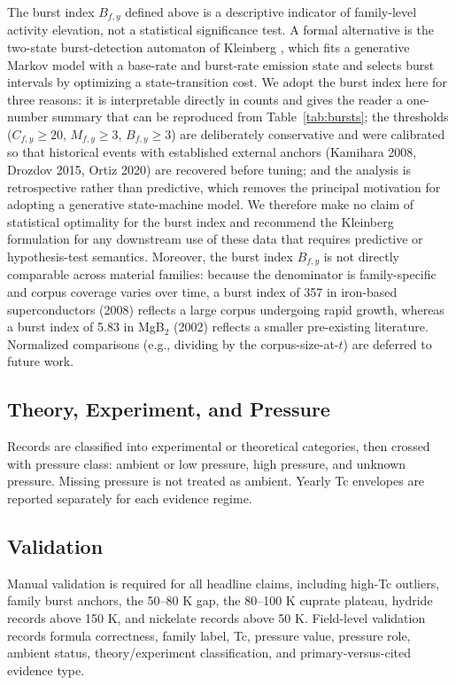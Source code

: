 \documentclass[11pt]{article}
\begin{document}
The burst index $B_{f,y}$ defined above is a descriptive indicator of family-level activity elevation, not a statistical significance test. A formal alternative is the two-state burst-detection automaton of Kleinberg \cite{kleinberg2003burst}, which fits a generative Markov model with a base-rate and burst-rate emission state and selects burst intervals by optimizing a state-transition cost. We adopt the burst index here for three reasons: it is interpretable directly in counts and gives the reader a one-number summary that can be reproduced from Table~\ref{tab:bursts}; the thresholds ($C_{f,y}\geq 20$, $M_{f,y}\geq 3$, $B_{f,y}\geq 3$) are deliberately conservative and were calibrated so that historical events with established external anchors (Kamihara 2008, Drozdov 2015, Ortiz 2020) are recovered before tuning; and the analysis is retrospective rather than predictive, which removes the principal motivation for adopting a generative state-machine model. We therefore make no claim of statistical optimality for the burst index and recommend the Kleinberg formulation for any downstream use of these data that requires predictive or hypothesis-test semantics. Moreover, the burst index $B_{f,y}$ is not directly comparable across material families: because the denominator is family-specific and corpus coverage varies over time, a burst index of 357 in iron-based superconductors (2008) reflects a large corpus undergoing rapid growth, whereas a burst index of 5.83 in MgB$_2$ (2002) reflects a smaller pre-existing literature. Normalized comparisons (e.g., dividing by the corpus-size-at-$t$) are deferred to future work.

\subsection{Theory, Experiment, and Pressure}

Records are classified into experimental or theoretical categories, then crossed with pressure class: ambient or low pressure, high pressure, and unknown pressure. Missing pressure is not treated as ambient. Yearly Tc envelopes are reported separately for each evidence regime.

\subsection{Validation}

Manual validation is required for all headline claims, including high-Tc outliers, family burst anchors, the 50--80 K gap, the 80--100 K cuprate plateau, hydride records above 150 K, and nickelate records above 50 K. Field-level validation records formula correctness, family label, Tc, pressure value, pressure role, ambient status, theory/experiment classification, and primary-versus-cited evidence type.
\end{document}
